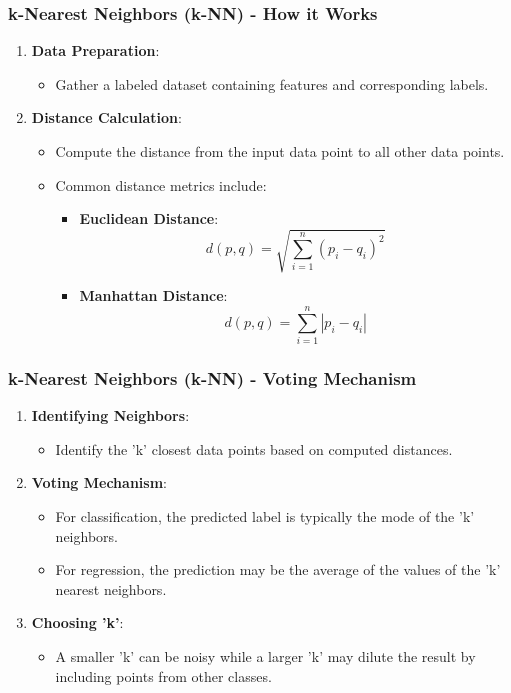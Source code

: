 \documentclass[aspectratio=169]{beamer}
\begin{document}
\begin{frame}
  \frametitle{k-Nearest Neighbors (k-NN) - How it Works}
  \begin{enumerate}
    \item \textbf{Data Preparation}:
      \begin{itemize}
        \item Gather a labeled dataset containing features and corresponding labels.
      \end{itemize}
    \item \textbf{Distance Calculation}:
      \begin{itemize}
        \item Compute the distance from the input data point to all other data points.
        \item Common distance metrics include:
          \begin{itemize}
            \item \textbf{Euclidean Distance}: 
            \begin{equation}
            d(p, q) = \sqrt{\sum_{i=1}^{n}(p_i - q_i)^2}
            \end{equation}
            \item \textbf{Manhattan Distance}: 
            \begin{equation}
            d(p, q) = \sum_{i=1}^{n}|p_i - q_i|
            \end{equation}
          \end{itemize}
      \end{itemize}
  \end{enumerate}
\end{frame}

\begin{frame}
  \frametitle{k-Nearest Neighbors (k-NN) - Voting Mechanism}
  \begin{enumerate}[resume]
    \item \textbf{Identifying Neighbors}:
      \begin{itemize}
        \item Identify the 'k' closest data points based on computed distances.
      \end{itemize}
    \item \textbf{Voting Mechanism}:
      \begin{itemize}
        \item For classification, the predicted label is typically the mode of the 'k' neighbors.
        \item For regression, the prediction may be the average of the values of the 'k' nearest neighbors.
      \end{itemize}
    \item \textbf{Choosing 'k'}:
      \begin{itemize}
        \item A smaller 'k' can be noisy while a larger 'k' may dilute the result by including points from other classes.
      \end{itemize}
  \end{enumerate}
\end{frame}
\end{document}
